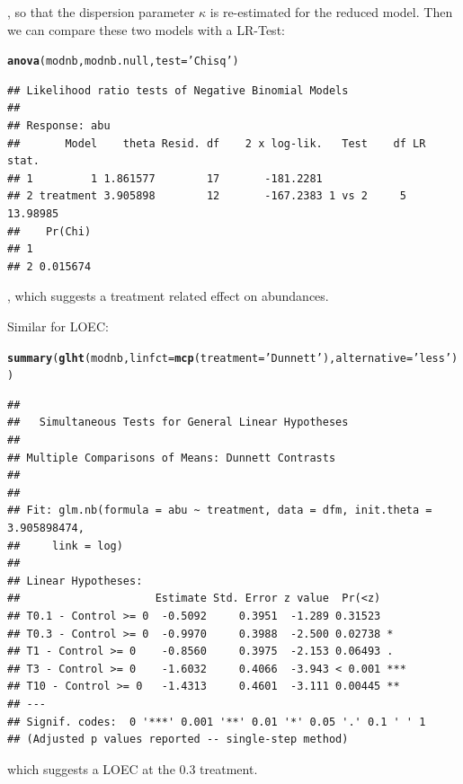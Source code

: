 \documentclass{scrartcl}\usepackage[]{graphicx}\usepackage[]{color}
\makeatletter
\newcommand{\hlstr}[1]{\textcolor[rgb]{0.192,0.494,0.8}{#1}}%
\newcommand{\hlstd}[1]{\textcolor[rgb]{0.345,0.345,0.345}{#1}}%
\newcommand{\hlkwc}[1]{\textcolor[rgb]{0.333,0.667,0.333}{#1}}%
\newcommand{\hlkwd}[1]{\textcolor[rgb]{0.737,0.353,0.396}{\textbf{#1}}}%
\newenvironment{kframe}{%
 \def\at@end@of@kframe{}%
 \ifinner\ifhmode%
  \def\at@end@of@kframe{\end{minipage}}%
  \begin{minipage}{\columnwidth}%
 \fi\fi%
 \def\FrameCommand##1{\hskip\@totalleftmargin \hskip-\fboxsep
 \colorbox{shadecolor}{##1}\hskip-\fboxsep
     \hskip-\linewidth \hskip-\@totalleftmargin \hskip\columnwidth}%
 \MakeFramed {\advance\hsize-\width
   \@totalleftmargin\z@ \linewidth\hsize
   \@setminipage}}%
 {\par\unskip\endMakeFramed%
 \at@end@of@kframe}
\newenvironment{knitrout}{}{} %
\makeatother
\begin{document}
, so that the dispersion parameter $\kappa$ is re-estimated for the reduced model.
Then we can compare these two models with a LR-Test:
\begin{knitrout}
\color{fgcolor}\begin{kframe}
\begin{alltt}
\hlkwd{anova}\hlstd{(modnb, modnb.null,} \hlkwc{test} \hlstd{=} \hlstr{'Chisq'}\hlstd{)}
\end{alltt}
\begin{verbatim}
## Likelihood ratio tests of Negative Binomial Models
## 
## Response: abu
##       Model    theta Resid. df    2 x log-lik.   Test    df LR stat.
## 1         1 1.861577        17       -181.2281                      
## 2 treatment 3.905898        12       -167.2383 1 vs 2     5 13.98985
##    Pr(Chi)
## 1         
## 2 0.015674
\end{verbatim}
\end{kframe}
\end{knitrout}
, which suggests a treatment related effect on abundances.

Similar for LOEC:
\begin{knitrout}
\color{fgcolor}\begin{kframe}
\begin{alltt}
\hlkwd{summary}\hlstd{(}\hlkwd{glht}\hlstd{(modnb,} \hlkwc{linfct} \hlstd{=} \hlkwd{mcp}\hlstd{(}\hlkwc{treatment} \hlstd{=} \hlstr{'Dunnett'}\hlstd{),}  \hlkwc{alternative} \hlstd{=} \hlstr{'less'}\hlstd{))}
\end{alltt}
\begin{verbatim}
## 
## 	 Simultaneous Tests for General Linear Hypotheses
## 
## Multiple Comparisons of Means: Dunnett Contrasts
## 
## 
## Fit: glm.nb(formula = abu ~ treatment, data = dfm, init.theta = 3.905898474, 
##     link = log)
## 
## Linear Hypotheses:
##                     Estimate Std. Error z value  Pr(<z)    
## T0.1 - Control >= 0  -0.5092     0.3951  -1.289 0.31523    
## T0.3 - Control >= 0  -0.9970     0.3988  -2.500 0.02738 *  
## T1 - Control >= 0    -0.8560     0.3975  -2.153 0.06493 .  
## T3 - Control >= 0    -1.6032     0.4066  -3.943 < 0.001 ***
## T10 - Control >= 0   -1.4313     0.4601  -3.111 0.00445 ** 
## ---
## Signif. codes:  0 '***' 0.001 '**' 0.01 '*' 0.05 '.' 0.1 ' ' 1
## (Adjusted p values reported -- single-step method)
\end{verbatim}
\end{kframe}
\end{knitrout}
which suggests a LOEC at the 0.3 treatment.
\end{document}
